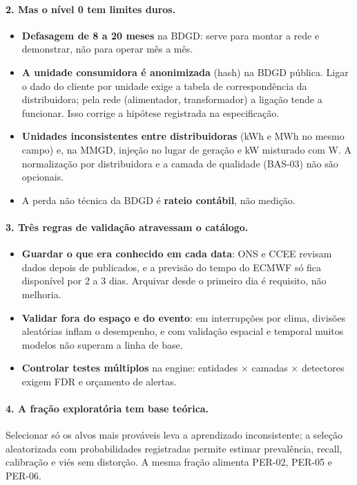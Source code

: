 \paragraph{2. Mas o nível 0 tem limites duros.}
\begin{itemize}
  \item \textbf{Defasagem de 8 a 20 meses} na BDGD: serve para montar a rede e
    demonstrar, não para operar mês a mês.
  \item \textbf{A unidade consumidora é anonimizada} (hash) na BDGD pública.
    Ligar o dado do cliente por unidade exige a tabela de correspondência da
    distribuidora; pela rede (alimentador, transformador) a ligação tende a
    funcionar. Isso corrige a hipótese registrada na especificação.
  \item \textbf{Unidades inconsistentes entre distribuidoras} (kWh e MWh no
    mesmo campo) e, na MMGD, injeção no lugar de geração e kW misturado com W.
    A normalização por distribuidora e a camada de qualidade (BAS-03) não são
    opcionais.
  \item A perda não técnica da BDGD é \textbf{rateio contábil}, não medição.
\end{itemize}

\paragraph{3. Três regras de validação atravessam o catálogo.}
\begin{itemize}
  \item \textbf{Guardar o que era conhecido em cada data}: ONS e CCEE revisam
    dados depois de publicados, e a previsão do tempo do ECMWF só fica
    disponível por 2 a 3 dias. Arquivar desde o primeiro dia é requisito, não
    melhoria.
  \item \textbf{Validar fora do espaço e do evento}: em interrupções por clima,
    divisões aleatórias inflam o desempenho, e com validação espacial e
    temporal muitos modelos não superam a linha de base.
  \item \textbf{Controlar testes múltiplos} na engine: entidades × camadas ×
    detectores exigem FDR e orçamento de alertas.
\end{itemize}

\paragraph{4. A fração exploratória tem base teórica.} Selecionar só os alvos
mais prováveis leva a aprendizado inconsistente; a seleção aleatorizada com
probabilidades registradas permite estimar prevalência, recall, calibração e
viés sem distorção. A mesma fração alimenta PER-02, PER-05 e PER-06.

